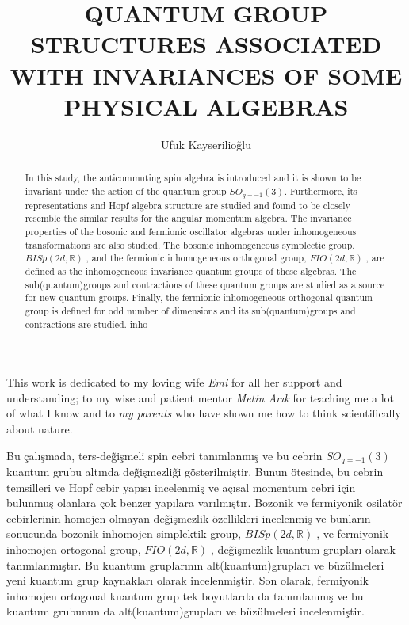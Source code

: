 \documentclass[12pt]{report}
\title{QUANTUM GROUP STRUCTURES ASSOCIATED WITH INVARIANCES OF SOME PHYSICAL ALGEBRAS}
\author{Ufuk Kayserilio\~ glu}
\def\IR{\mathbb{R}}
\def\FIO{$FIO(2d, \IR)\;$}
\def\BISp{$BISp(2d, \IR)\;$}
\begin{document}
%
\makephdtitle      %

\makeapprovalpage

\begin{acknowledgements}
This work is dedicated to my loving wife \textit{Emi} for all her support and understanding;
to my wise and patient mentor \textit{Metin Ar{\i}k} for teaching me a lot of what I know
and to \textit{my parents} who have shown me how to think scientifically about nature.
\end{acknowledgements}

\begin{abstract}
In this study, the anticommuting spin algebra is introduced and it is
shown to be invariant under the action of the quantum group $SO_{q = -1}(3)$.
Furthermore, its representations and Hopf algebra structure are studied and
found to be closely resemble the similar results for the angular momentum
algebra. The invariance properties of the bosonic and fermionic oscillator
algebras under inhomogeneous transformations are also studied. The bosonic
inhomogeneous symplectic group, \BISp, and the fermionic
inhomogeneous orthogonal group, \FIO, are defined as the inhomogeneous invariance
quantum groups of these algebras. The sub(quantum)groups and contractions of these
quantum groups are studied as a source for new quantum groups. Finally, the
fermionic inhomogeneous orthogonal quantum group is defined for odd number of
dimensions and its sub(quantum)groups and contractions are studied.
inho
\end{abstract}
%
%
\begin{ozet}
Bu \c{c}al{\i}\c{s}mada, ters-de\~{g}i\c{s}meli spin cebri tan{\i}mlanm{\i}\c{s} ve bu cebrin $SO_{q = -1}(3)$
kuantum grubu alt{\i}nda de\~{g}i\c{s}mezli\~{g}i g\"{o}sterilmi\c{s}tir. Bunun \"{o}tesinde, bu cebrin temsilleri
ve Hopf cebir yap{\i}s{\i} incelenmi\c{s} ve a\c{c}{\i}sal momentum cebri i\c{c}in bulunmu\c{s} olanlara
\c{c}ok benzer yap{\i}lara var{\i}lm{\i}\c{s}t{\i}r. Bozonik ve fermiyonik osilat\"{o}r cebirlerinin homojen
olmayan de\~{g}i\c{s}mezlik \"{o}zellikleri incelenmi\c{s} ve bunlar{\i}n sonucunda bozonik inhomojen
simplektik group, \BISp, ve fermiyonik inhomojen ortogonal group, \FIO,
de\~{g}i\c{s}mezlik kuantum gruplar{\i} olarak tan{\i}mlanm{\i}\c{s}t{\i}r. Bu kuantum gruplar{\i}n{\i}n alt(kuantum)gruplar{\i}
ve b\"{u}z\"{u}lmeleri yeni kuantum grup kaynaklar{\i} olarak incelenmi\c{s}tir. Son olarak, fermiyonik
inhomojen ortogonal kuantum grup tek boyutlarda da tan{\i}mlanm{\i}\c{s} ve bu kuantum grubunun da
alt(kuantum)gruplar{\i} ve b\"{u}z\"{u}lmeleri incelenmi\c{s}tir.
\end{ozet}
\end{document}
